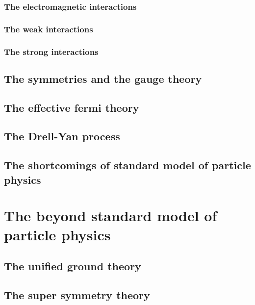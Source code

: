 \subsubsection{The electromagnetic interactions}\label{subsubsec:elemag_interaction}
\subsubsection{The weak interactions}\label{subsubsec:weak_interaction}
\subsubsection{The strong interactions}\label{subsubsec:strong_interaction}

\subsection{The symmetries and the gauge theory}\label{subsec:symmetry}
\subsection{The effective fermi theory}\label{subsec:EFT}
\subsection{The Drell-Yan process}\label{subsec:DY}
\subsection{The shortcomings of standard model of particle physics}\label{subsec:shortcoming}
\section{The beyond standard model of particle physics}\label{sec:BSM}
\subsection{The unified ground theory}\label{subsec:GUT}
\subsection{The super symmetry theory}\label{subsec:SUSY}
